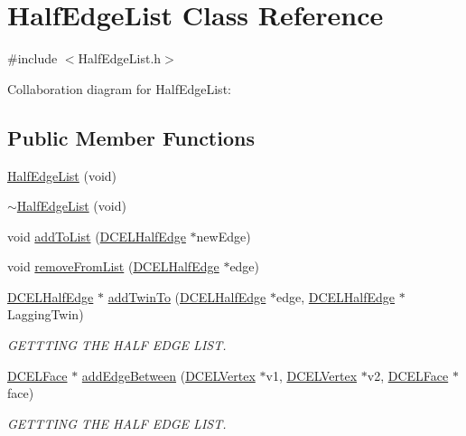 \hypertarget{classHalfEdgeList}{}\section{Half\+Edge\+List Class Reference}
\label{classHalfEdgeList}


{\ttfamily \#include $<$Half\+Edge\+List.\+h$>$}



Collaboration diagram for Half\+Edge\+List\+:
\subsection*{Public Member Functions}
\begin{DoxyCompactItemize}
\item 
\hyperlink{classHalfEdgeList_a1ff1519220262a0201ec31f25c82bce8}{Half\+Edge\+List} (void)
\item 
\hyperlink{classHalfEdgeList_a1591ee3ae811b044007b48e1aae161bd}{$\sim$\+Half\+Edge\+List} (void)
\item 
void \hyperlink{classHalfEdgeList_a66b89983619ef0beaa680dc3b0d9179f}{add\+To\+List} (\hyperlink{classDCELHalfEdge}{D\+C\+E\+L\+Half\+Edge} $\ast$new\+Edge)
\item 
void \hyperlink{classHalfEdgeList_ad66f55a2db0dfc0842317686c641317f}{remove\+From\+List} (\hyperlink{classDCELHalfEdge}{D\+C\+E\+L\+Half\+Edge} $\ast$edge)
\item 
\hyperlink{classDCELHalfEdge}{D\+C\+E\+L\+Half\+Edge} $\ast$ \hyperlink{classHalfEdgeList_a692ec0ad40cb6d94ccddba451d45c870}{add\+Twin\+To} (\hyperlink{classDCELHalfEdge}{D\+C\+E\+L\+Half\+Edge} $\ast$edge, \hyperlink{classDCELHalfEdge}{D\+C\+E\+L\+Half\+Edge} $\ast$Lagging\+Twin)
\begin{DoxyCompactList}\small\item\em G\+E\+T\+T\+T\+I\+NG T\+HE H\+A\+LF E\+D\+GE L\+I\+ST. \end{DoxyCompactList}\item 
\hyperlink{classDCELFace}{D\+C\+E\+L\+Face} $\ast$ \hyperlink{classHalfEdgeList_a71cf7be9a61cbab5e9aed5acdac1e971}{add\+Edge\+Between} (\hyperlink{classDCELVertex}{D\+C\+E\+L\+Vertex} $\ast$v1, \hyperlink{classDCELVertex}{D\+C\+E\+L\+Vertex} $\ast$v2, \hyperlink{classDCELFace}{D\+C\+E\+L\+Face} $\ast$face)
\begin{DoxyCompactList}\small\item\em G\+E\+T\+T\+T\+I\+NG T\+HE H\+A\+LF E\+D\+GE L\+I\+ST. \end{DoxyCompactList}\end{DoxyCompactItemize}
